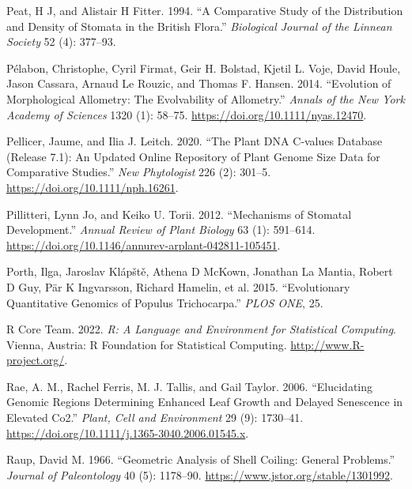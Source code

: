 \documentclass[
  12pt,
]{article}
\newlength{\cslhangindent}
\newlength{\cslentryspacingunit} %
\newenvironment{CSLReferences}[2] %
 {%
  \setlength{\parindent}{0pt}
  \ifodd #1
  \let\oldpar\par
  \def\par{\hangindent=\cslhangindent\oldpar}
  \fi
  \setlength{\parskip}{#2\cslentryspacingunit}
 }%
 {}
\begin{document}
\begin{CSLReferences}{1}{0}
\leavevmode{}%
Peat, H J, and Alistair H Fitter. 1994. {``A Comparative Study of the Distribution and Density of Stomata in the {British} Flora.''} \emph{Biological Journal of the Linnean Society} 52 (4): 377--93.

\leavevmode{}%
Pélabon, Christophe, Cyril Firmat, Geir H. Bolstad, Kjetil L. Voje, David Houle, Jason Cassara, Arnaud Le Rouzic, and Thomas F. Hansen. 2014. {``Evolution of Morphological Allometry: {The} Evolvability of Allometry.''} \emph{Annals of the New York Academy of Sciences} 1320 (1): 58--75. \url{https://doi.org/10.1111/nyas.12470}.

\leavevmode{}%
Pellicer, Jaume, and Ilia J. Leitch. 2020. {``The {Plant} {DNA} {C}‐values Database (Release 7.1): An Updated Online Repository of Plant Genome Size Data for Comparative Studies.''} \emph{New Phytologist} 226 (2): 301--5. \url{https://doi.org/10.1111/nph.16261}.

\leavevmode{}%
Pillitteri, Lynn Jo, and Keiko U. Torii. 2012. {``Mechanisms of {Stomatal} {Development}.''} \emph{Annual Review of Plant Biology} 63 (1): 591--614. \url{https://doi.org/10.1146/annurev-arplant-042811-105451}.

\leavevmode{}%
Porth, Ilga, Jaroslav Klápště, Athena D McKown, Jonathan La Mantia, Robert D Guy, Pär K Ingvarsson, Richard Hamelin, et al. 2015. {``Evolutionary {Quantitative} {Genomics} of {Populus} Trichocarpa.''} \emph{PLOS ONE}, 25.

\leavevmode{}%
R Core Team. 2022. \emph{R: {A} {Language} and {Environment} for {Statistical} {Computing}}. Vienna, Austria: R Foundation for Statistical Computing. \url{http://www.R-project.org/}.

\leavevmode{}%
Rae, A. M., Rachel Ferris, M. J. Tallis, and Gail Taylor. 2006. {``Elucidating Genomic Regions Determining Enhanced Leaf Growth and Delayed Senescence in Elevated {Co2}.''} \emph{Plant, Cell and Environment} 29 (9): 1730--41. \url{https://doi.org/10.1111/j.1365-3040.2006.01545.x}.

\leavevmode{}%
Raup, David M. 1966. {``Geometric {Analysis} of {Shell} {Coiling}: {General} {Problems}.''} \emph{Journal of Paleontology} 40 (5): 1178--90. \url{https://www.jstor.org/stable/1301992}.


\end{CSLReferences}
\end{document}
